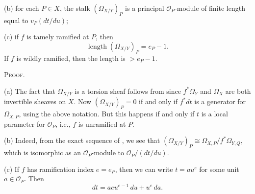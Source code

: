 {{\hypertarget{result-IV-2.2b}{}(b) for each $P\in X$, the stalk $(\Omega_{X/Y})_P$ is a principal $\mathcal O_P$-module of finite length equal to $v_P(dt/du)$;

\hypertarget{result-IV-2.2c}{}(c) if $f$ is tamely ramified at $P$, then
\[
\operatorname{length}(\Omega_{X/Y})_P=e_P-1.
\]
If $f$ is wildly ramified, then the length is $> e_P-1$.\par}

\smallskip
\noindent\textsc{Proof.}\par
(a) The fact that $\Omega_{X/Y}$ is a torsion sheaf follows from  since $f^*\Omega_Y$ and $\Omega_X$ are both invertible sheaves on $X$. Now $(\Omega_{X/Y})_P=0$ if and only if $f^*dt$ is a generator for $\Omega_{X,P}$, using the above notation. But this happens if and only if $t$ is a local parameter for $\mathcal O_P$, i.e., $f$ is unramified at $P$.

(b) Indeed, from the exact sequence of , we see that $(\Omega_{X/Y})_P\cong\Omega_{X,P}/f^*\Omega_{Y,Q}$, which is isomorphic as an $\mathcal O_P$-module to $\mathcal O_P/(dt/du)$.

(c) If $f$ has ramification index $e=e_P$, then we can write $t=au^e$ for some unit $a\in\mathcal O_P$. Then
\[
dt=aeu^{e-1}\,du+u^e\,da.
\]
}
